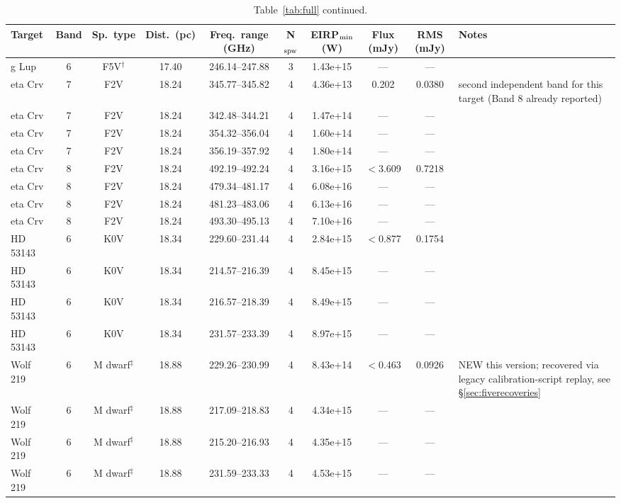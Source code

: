 \documentclass{openjournal}
\begin{document}
\begin{table}
\centering
\scriptsize
\caption{Table~\ref{tab:full} continued.}
\label{tab:full7}
\begin{tabularx}{\textwidth}{@{}l c c c c c c c c X@{}}
\hline
Target & Band & Sp.\ type & Dist.\ (pc) & Freq.\ range (GHz) & N$_{\rm spw}$ & EIRP$_{\rm min}$ (W) & Flux (mJy) & RMS (mJy) & Notes \\
\hline
g Lup & 6 & F5V$^\dagger$ & 17.40 & 246.14--247.88 & 3 & 1.43e+15 & --- & --- &  \\
eta Crv & 7 & F2V & 18.24 & 345.77--345.82 & 4 & 4.36e+13 & 0.202 & 0.0380 & second independent band for this target (Band 8 already reported) \\
eta Crv & 7 & F2V & 18.24 & 342.48--344.21 & 4 & 1.47e+14 & --- & --- &  \\
eta Crv & 7 & F2V & 18.24 & 354.32--356.04 & 4 & 1.60e+14 & --- & --- &  \\
eta Crv & 7 & F2V & 18.24 & 356.19--357.92 & 4 & 1.80e+14 & --- & --- &  \\
eta Crv & 8 & F2V & 18.24 & 492.19--492.24 & 4 & 3.16e+15 & $<$3.609 & 0.7218 &  \\
eta Crv & 8 & F2V & 18.24 & 479.34--481.17 & 4 & 6.08e+16 & --- & --- &  \\
eta Crv & 8 & F2V & 18.24 & 481.23--483.06 & 4 & 6.13e+16 & --- & --- &  \\
eta Crv & 8 & F2V & 18.24 & 493.30--495.13 & 4 & 7.10e+16 & --- & --- &  \\
HD 53143 & 6 & K0V & 18.34 & 229.60--231.44 & 4 & 2.84e+15 & $<$0.877 & 0.1754 &  \\
HD 53143 & 6 & K0V & 18.34 & 214.57--216.39 & 4 & 8.45e+15 & --- & --- &  \\
HD 53143 & 6 & K0V & 18.34 & 216.57--218.39 & 4 & 8.49e+15 & --- & --- &  \\
HD 53143 & 6 & K0V & 18.34 & 231.57--233.39 & 4 & 8.97e+15 & --- & --- &  \\
Wolf  219 & 6 & M dwarf$^\ddagger$ & 18.88 & 229.26--230.99 & 4 & 8.43e+14 & $<$0.463 & 0.0926 & NEW this version; recovered via legacy calibration-script replay, see \S\ref{sec:fiverecoveries} \\
Wolf  219 & 6 & M dwarf$^\ddagger$ & 18.88 & 217.09--218.83 & 4 & 4.34e+15 & --- & --- &  \\
Wolf  219 & 6 & M dwarf$^\ddagger$ & 18.88 & 215.20--216.93 & 4 & 4.35e+15 & --- & --- &  \\
Wolf  219 & 6 & M dwarf$^\ddagger$ & 18.88 & 231.59--233.33 & 4 & 4.53e+15 & --- & --- &  \\

\end{tabularx}
\end{table}
\end{document}
